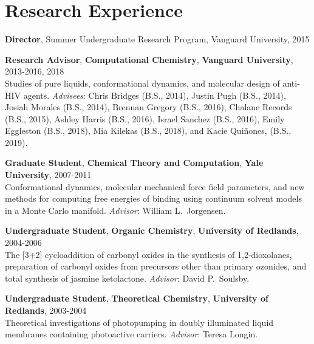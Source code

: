 \documentclass[10pt]{article}
\newcommand*\resitem[7]{\textbf{#1}, \textbf{#2}, \textbf{#3}, #4\\#5 \textit{#6}: #7}
\begin{document}

\section{Research Experience}


\textbf{Director}, Summer Undergraduate Research Program, Vanguard University, 2015 

\resitem{Research Advisor}{Computational Chemistry}{Vanguard University}{2013-2016, 2018}
{Studies of pure liquids, conformational dynamics, and molecular design of anti-HIV agents.}
{Advisees}{Chris Bridges (B.S., 2014), Justin Pugh (B.S., 2014), Josiah Morales (B.S., 2014), Brennan Gregory (B.S., 2016), Chalane Records (B.S., 2015), Ashley Harris (B.S., 2016),  Israel Sanchez (B.S., 2016), Emily Eggleston (B.S., 2018), Mia Kilekas (B.S., 2018), and Kacie Qui\~nones, (B.S., 2019).}

\resitem{Graduate Student}{Chemical Theory and Computation}{Yale University}{2007-2011}
{Conformational dynamics, molecular mechanical 
force field parameters, and new methods for computing free 
energies of binding using continuum solvent models in a Monte Carlo 
manifold.}{Advisor}{William L.\ Jorgensen.}

\resitem{Undergraduate Student}{Organic Chemistry}{University of Redlands}{2004-2006}
{The [3+2] cycloaddition of carbonyl oxides in the synthesis of 1,2-dioxolanes, 
preparation of carbonyl oxides from precursors other than primary ozonides, 
and total synthesis of jasmine ketolactone.}{Advisor}{David P.\ Soulsby.}

\resitem{Undergraduate Student}{Theoretical Chemistry}{University of Redlands}{2003-2004}
{Theoretical investigations of photopumping in doubly illuminated liquid membranes containing photoactive carriers.}{Advisor}
{Teresa Longin.}

\end{document}
